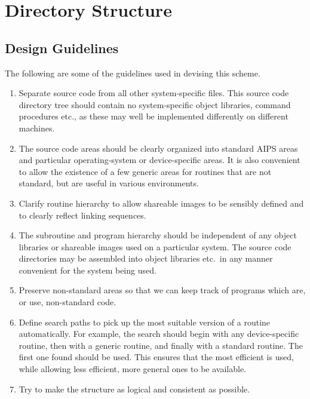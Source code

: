 \section{Directory Structure}

\subsection{Design Guidelines}
The following are some of the guidelines used in devising this scheme.
\begin{enumerate} %
\item Separate source code from all other system-specific files. This source
code directory tree should contain no system-specific object
libraries, command procedures etc., as these may well be implemented
differently on different machines.
\item The source code areas should be clearly organized into standard
AIPS areas and particular operating-system or device-specific areas.
It is also convenient to allow the existence of a few generic areas
for routines that are not standard, but are useful in various
environments.
\item Clarify routine hierarchy to allow shareable images to be sensibly
defined and to clearly reflect linking sequences.
\item The subroutine and program hierarchy should be independent of any
object libraries or shareable images used on a particular system. The
source code directories may be assembled into object libraries etc.~in
any manner convenient for the system being used.
\item Preserve non-standard areas so that we can keep track of programs
which are, or use, non-standard code.
\item Define search paths to pick up the most suitable version of a routine
automatically. For example, the search should begin with any
device-specific routine, then with a generic routine, and finally with
a standard routine. The first one found should be used. This ensures
that the most efficient is used, while allowing less efficient, more
general ones to be available.
\item Try to make the structure as logical and consistent as possible.

\end{enumerate} %

